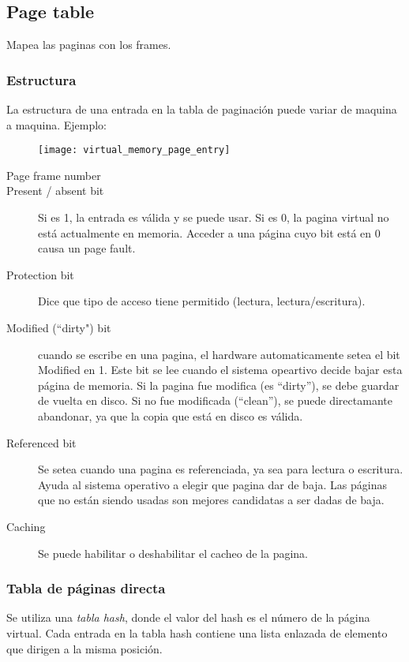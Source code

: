 \documentclass[a4paper, twoside]{article}
\begin{document}
\subsection{Page table}
Mapea las paginas con los frames.
\subsubsection{Estructura}
La estructura de una entrada en la tabla de paginación puede variar de maquina a maquina.
Ejemplo:
\begin{figure}[H]
	\centering
	\texttt{[image: virtual\_memory\_page\_entry]}
	\label{fig:virtual_memory_page_entry}
\end{figure}

\begin{description}
	\item[Page frame number]
	\item[Present / absent bit] Si es 1, la entrada es válida y se puede usar. Si es 0, la pagina virtual no está actualmente en memoria. Acceder a una página cuyo bit está en 0 causa un page fault.
	\item[Protection bit] Dice que tipo de acceso tiene permitido (lectura, lectura/escritura).
	\item[Modified (“dirty") bit] cuando se escribe en una pagina, el hardware automaticamente setea el bit Modified en 1. Este bit se lee cuando el sistema opeartivo decide bajar esta página de memoria. Si la pagina fue modifica (es “dirty”), se debe guardar de vuelta en disco. Si no fue modificada (“clean”), se puede directamante abandonar, ya que la copia que está en disco es válida.
	\item[Referenced bit] Se setea cuando una pagina es referenciada, ya sea para lectura o escritura. Ayuda al sistema operativo a elegir que pagina dar de baja. Las páginas que no están siendo usadas son mejores candidatas a ser dadas de baja.
	\item[Caching] Se puede habilitar o deshabilitar el cacheo de la pagina.
\end{description}

\subsubsection{Tabla de páginas directa}
Se utiliza una \emph{tabla hash}, donde el valor del hash es el número de la página virtual. Cada entrada en la tabla hash contiene una lista enlazada de elemento que dirigen a la misma posición.
\end{document}
